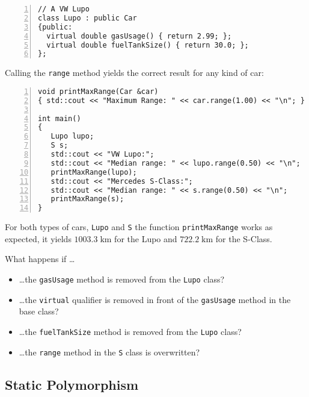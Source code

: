 \begin{example}
\begin{lstlisting}[basicstyle=\ttfamily\scriptsize,numbers=left,numberstyle=\tiny, numbersep=5pt]
// A VW Lupo
class Lupo : public Car
{public:
  virtual double gasUsage() { return 2.99; };
  virtual double fuelTankSize() { return 30.0; };
};
\end{lstlisting}

\noindent
Calling the \texttt{range} method yields the correct result for any
kind of car:
\begin{lstlisting}[basicstyle=\ttfamily\scriptsize,numbers=left,numberstyle=\tiny, numbersep=5pt]
void printMaxRange(Car &car)
{ std::cout << "Maximum Range: " << car.range(1.00) << "\n"; }

int main()
{
   Lupo lupo;
   S s;
   std::cout << "VW Lupo:";
   std::cout << "Median range: " << lupo.range(0.50) << "\n";
   printMaxRange(lupo);
   std::cout << "Mercedes S-Class:";
   std::cout << "Median range: " << s.range(0.50) << "\n";
   printMaxRange(s);
}
\end{lstlisting}

For both types of cars, \texttt{Lupo} and \texttt{S} the function
\texttt{printMaxRange} works as expected, it yields
$1003.3\;\mathrm{km}$ for the Lupo and $722.2\;\mathrm{km}$ for the
S-Class.
\end{example}

\begin{exc}
What happens if \dots
\begin{itemize}
\item \dots the \texttt{gasUsage} method is removed from the \texttt{Lupo} class?
\item \dots the \texttt{virtual} qualifier is removed in front of the
  \texttt{gasUsage} method in the base class?
\item \dots the \texttt{fuelTankSize} method is removed from the \texttt{Lupo} class?
\item \dots the \texttt{range} method in the \texttt{S} class is
  overwritten?
\end{itemize}
\end{exc}

\subsection*{Static Polymorphism}

